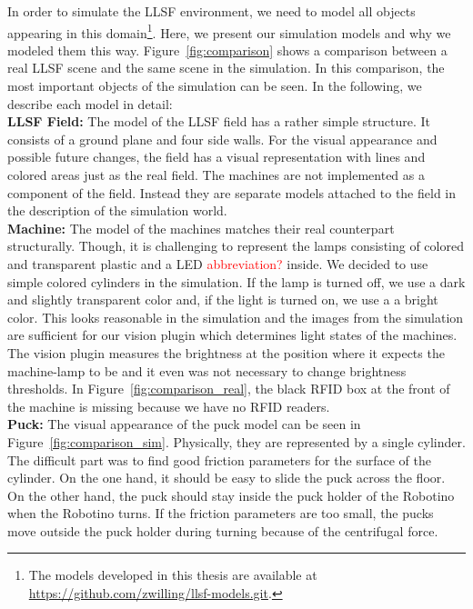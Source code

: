 In order to simulate the LLSF environment, we need to model all objects appearing in this domain\footnote{The models developed in this thesis are available at \url{https://github.com/zwilling/llsf-models.git}.}. Here, we present our simulation models and why we modeled them this way. Figure~\ref{fig:comparison} shows a comparison between a real LLSF scene and the same scene in the simulation. In this comparison, the most important objects of the simulation can be seen. In the following, we describe each model in detail:\\
\textbf{LLSF Field:} The model of the LLSF field has a rather simple structure. It consists of a ground plane and four side walls. For the visual appearance and possible future changes, the field has a visual representation with lines and colored areas just as the real field. The machines are not implemented as a component of the field. Instead they are separate models attached to the field in the description of the simulation world.\\
\textbf{Machine:} The model of the machines matches their real counterpart structurally. Though, it is challenging to represent the lamps consisting of colored and transparent plastic and a LED \textcolor{red}{abbreviation?} inside. We decided to use simple colored cylinders in the simulation. If the lamp is turned off, we use a dark and slightly transparent color and, if the light is turned on, we use a a bright color. This looks reasonable in the simulation and the images from the simulation are sufficient for our vision plugin which determines light states of the machines. The vision plugin measures the brightness at the position where it expects the machine-lamp to be and it even was not necessary to change brightness thresholds. In Figure~\ref{fig:comparison_real}, the black RFID box at the front of the machine is missing because we have no RFID readers.\\
\textbf{Puck:} The visual appearance of the puck model can be seen in Figure~\ref{fig:comparison_sim}. Physically, they are represented by a single cylinder. The difficult part was to find good friction parameters for the surface of the cylinder. On the one hand, it should be easy to slide the puck across the floor. On the other hand, the puck should stay inside the puck holder of the Robotino when the Robotino turns. If the friction parameters are too small, the pucks move outside the puck holder during turning because of the centrifugal force.\\
